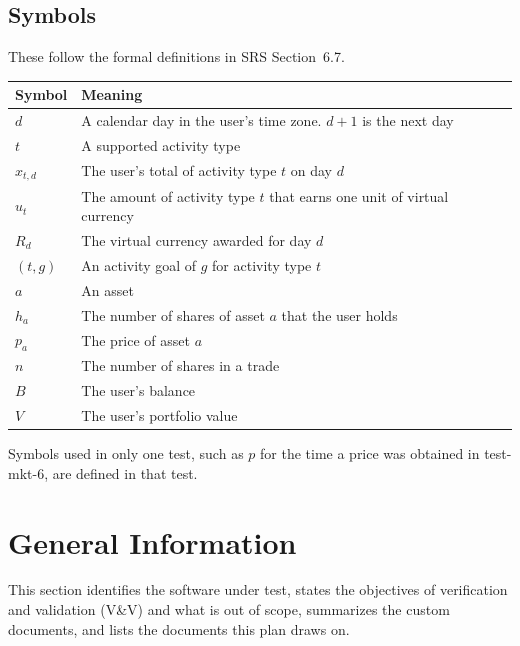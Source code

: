 \documentclass[12pt, titlepage]{article}
\begin{document}
\bigskip
\noindent\begin{minipage}{\textwidth}
\subsection*{Symbols}

These follow the formal definitions in SRS Section~6.7.

\smallskip
\begin{tabularx}{\textwidth}{l X}
  \toprule
  \textbf{Symbol} & \textbf{Meaning}\\
  \midrule
  $d$ & A calendar day in the user's time zone. $d+1$ is the next day\\
  $t$ & A supported activity type\\
  $x_{t,d}$ & The user's total of activity type $t$ on day $d$\\
  $u_t$ & The amount of activity type $t$ that earns one unit of virtual
    currency\\
  $R_d$ & The virtual currency awarded for day $d$\\
  $(t, g)$ & An activity goal of $g$ for activity type $t$\\
  $a$ & An asset\\
  $h_a$ & The number of shares of asset $a$ that the user holds\\
  $p_a$ & The price of asset $a$\\
  $n$ & The number of shares in a trade\\
  $B$ & The user's balance\\
  $V$ & The user's portfolio value\\
  \bottomrule
\end{tabularx}
\end{minipage}

\medskip
\noindent Symbols used in only one test, such as $p$ for the time a price was
obtained in test-mkt-6, are defined in that test.

\newpage



\section{General Information}

This section identifies the software under test, states the objectives of
verification and validation (V\&V) and what is out of scope, summarizes the
custom documents, and lists the documents this plan draws on.
\end{document}
